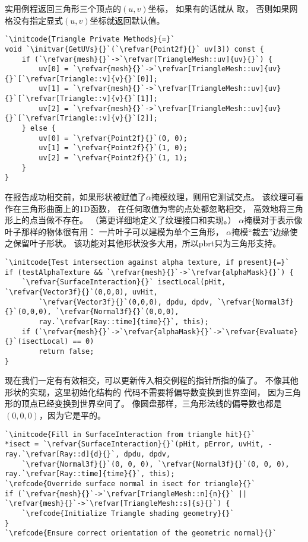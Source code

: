 实用例程返回三角形三个顶点的$(u,v)$坐标，
如果有的话就从
取，
否则如果网格没有指定显式$(u,v)$坐标就返回默认值。
\begin{lstlisting}
`\initcode{Triangle Private Methods}{=}`
void `\initvar{GetUVs}{}`(`\refvar{Point2f}{}` uv[3]) const {
    if (`\refvar{mesh}{}`->`\refvar[TriangleMesh::uv]{uv}{}`) {
        uv[0] = `\refvar{mesh}{}`->`\refvar[TriangleMesh::uv]{uv}{}`[`\refvar[Triangle::v]{v}{}`[0]];
        uv[1] = `\refvar{mesh}{}`->`\refvar[TriangleMesh::uv]{uv}{}`[`\refvar[Triangle::v]{v}{}`[1]];
        uv[2] = `\refvar{mesh}{}`->`\refvar[TriangleMesh::uv]{uv}{}`[`\refvar[Triangle::v]{v}{}`[2]];
    } else {
        uv[0] = `\refvar{Point2f}{}`(0, 0);
        uv[1] = `\refvar{Point2f}{}`(1, 0);
        uv[2] = `\refvar{Point2f}{}`(1, 1);
    }
}
\end{lstlisting}

在报告成功相交前，如果形状被赋值了$\alpha$掩模纹理，则用它测试交点。
该纹理可看作在三角形曲面上的1D函数，
在任何取值为零的点处都忽略相交，
高效地将三角形上的点当做不存在。
（第更详细地定义了纹理接口和实现。）
$\alpha$掩模对于表示像叶子那样的物体很有用：
一片叶子可以建模为单个三角形，
$\alpha$掩模“裁去”边缘使之保留叶子形状。
该功能对其他形状没多大用，所以pbrt只为三角形支持。
\begin{lstlisting}
`\initcode{Test intersection against alpha texture, if present}{=}`
if (testAlphaTexture && `\refvar{mesh}{}`->`\refvar{alphaMask}{}`) {
    `\refvar{SurfaceInteraction}{}` isectLocal(pHit, `\refvar{Vector3f}{}`(0,0,0), uvHit,
        `\refvar{Vector3f}{}`(0,0,0), dpdu, dpdv, `\refvar{Normal3f}{}`(0,0,0), `\refvar{Normal3f}{}`(0,0,0),
        ray.`\refvar[Ray::time]{time}{}`, this);
    if (`\refvar{mesh}{}`->`\refvar{alphaMask}{}`->`\refvar{Evaluate}{}`(isectLocal) == 0)
        return false;
}
\end{lstlisting}
现在我们一定有有效相交，可以更新传入相交例程的指针所指的值了。
不像其他形状的实现，这里初始化结构的
代码不需要将偏导数变换到世界空间，
因为三角形的顶点已经变换到世界空间了。
像圆盘那样，三角形法线的偏导数也都是$(0,0,0)$，因为它是平的。
\begin{lstlisting}
`\initcode{Fill in SurfaceInteraction from triangle hit}{}`
*isect = `\refvar{SurfaceInteraction}{}`(pHit, pError, uvHit, -ray.`\refvar[Ray::d]{d}{}`, dpdu, dpdv,
    `\refvar{Normal3f}{}`(0, 0, 0), `\refvar{Normal3f}{}`(0, 0, 0), ray.`\refvar[Ray::time]{time}{}`, this);
`\refcode{Override surface normal in isect for triangle}{}`
if (`\refvar{mesh}{}`->`\refvar[TriangleMesh::n]{n}{}` || `\refvar{mesh}{}`->`\refvar[TriangleMesh::s]{s}{}`) {
    `\refcode{Initialize Triangle shading geometry}{}`
}
`\refcode{Ensure correct orientation of the geometric normal}{}`
\end{lstlisting}

